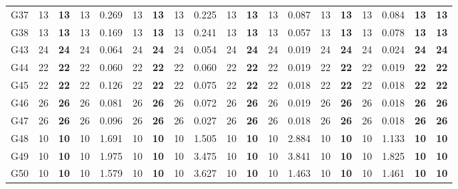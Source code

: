 \documentclass[12pt, a4paper]{article}%
\numberwithin{equation}{section}
\theoremstyle{plain}
\begin{document}
{\begin{landscape}
\begin{longtable}{lllllllllllllllllll}
						G37                       & 13   & \textbf{13} & 13  & 0.269 & 13   & \textbf{13} & 13  & 0.225 & 13   & \textbf{13} & 13  & 0.087 & 13   & \textbf{13} & 13  & 0.084 & \textbf{13}             & \textbf{13}          \\
						G38                       & 13   & \textbf{13} & 13  & 0.169 & 13   & \textbf{13} & 13  & 0.241 & 13   & \textbf{13} & 13  & 0.057 & 13   & \textbf{13} & 13  & 0.078 & \textbf{13}             & \textbf{13}          \\
						G43                       & 24   & \textbf{24} & 24  & 0.064 & 24   & \textbf{24} & 24  & 0.054 & 24   & \textbf{24} & 24  & 0.019 & 24   & \textbf{24} & 24  & 0.024 & \textbf{24}             & \textbf{24}          \\
						G44                       & 22   & \textbf{22} & 22  & 0.060 & 22   & \textbf{22} & 22  & 0.060 & 22   & \textbf{22} & 22  & 0.019 & 22   & \textbf{22} & 22  & 0.019 & \textbf{22}             & \textbf{22}          \\
						G45                       & 22   & \textbf{22} & 22  & 0.126 & 22   & \textbf{22} & 22  & 0.075 & 22   & \textbf{22} & 22  & 0.018 & 22   & \textbf{22} & 22  & 0.018 & \textbf{22}             & \textbf{22}          \\
						G46                       & 26   & \textbf{26} & 26  & 0.081 & 26   & \textbf{26} & 26  & 0.072 & 26   & \textbf{26} & 26  & 0.019 & 26   & \textbf{26} & 26  & 0.018 & \textbf{26}             & \textbf{26}          \\
						G47                       & 26   & \textbf{26} & 26  & 0.096 & 26   & \textbf{26} & 26  & 0.027 & 26   & \textbf{26} & 26  & 0.018 & 26   & \textbf{26} & 26  & 0.018 & \textbf{26}             & \textbf{26}          \\
						G48                       & 10   & \textbf{10} & 10  & 1.691 & 10   & \textbf{10} & 10  & 1.505 & 10   & \textbf{10} & 10  & 2.884 & 10   & \textbf{10} & 10  & 1.133 & \textbf{10}             & \textbf{10}          \\
						G49                       & 10   & \textbf{10} & 10  & 1.975 & 10   & \textbf{10} & 10  & 3.475 & 10   & \textbf{10} & 10  & 3.841 & 10   & \textbf{10} & 10  & 1.825 & \textbf{10}             & \textbf{10}          \\
						G50                       & 10   & \textbf{10} & 10  & 1.579 & 10   & \textbf{10} & 10  & 3.627 & 10   & \textbf{10} & 10  & 1.463 & 10   & \textbf{10} & 10  & 1.461 & \textbf{10}             & \textbf{10}          \\

\end{longtable}
\end{landscape}}
\end{document}
